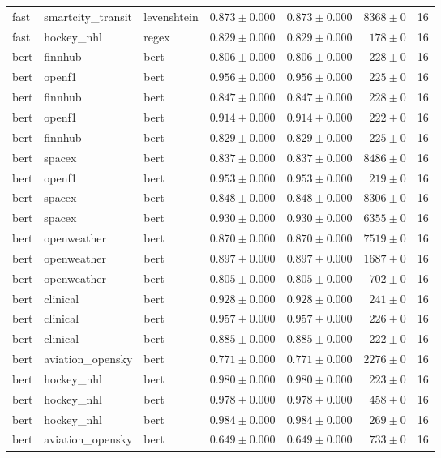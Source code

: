 \begin{table}[htbp]
\begin{tabular}{l l l r r r r}
fast & smartcity\_transit & levenshtein & $0.873\pm0.000$ & $0.873\pm0.000$ & $8368\pm0$ & 16 \\
fast & hockey\_nhl & regex & $0.829\pm0.000$ & $0.829\pm0.000$ & $178\pm0$ & 16 \\
bert & finnhub & bert & $0.806\pm0.000$ & $0.806\pm0.000$ & $228\pm0$ & 16 \\
bert & openf1 & bert & $0.956\pm0.000$ & $0.956\pm0.000$ & $225\pm0$ & 16 \\
bert & finnhub & bert & $0.847\pm0.000$ & $0.847\pm0.000$ & $228\pm0$ & 16 \\
bert & openf1 & bert & $0.914\pm0.000$ & $0.914\pm0.000$ & $222\pm0$ & 16 \\
bert & finnhub & bert & $0.829\pm0.000$ & $0.829\pm0.000$ & $225\pm0$ & 16 \\
bert & spacex & bert & $0.837\pm0.000$ & $0.837\pm0.000$ & $8486\pm0$ & 16 \\
bert & openf1 & bert & $0.953\pm0.000$ & $0.953\pm0.000$ & $219\pm0$ & 16 \\
bert & spacex & bert & $0.848\pm0.000$ & $0.848\pm0.000$ & $8306\pm0$ & 16 \\
bert & spacex & bert & $0.930\pm0.000$ & $0.930\pm0.000$ & $6355\pm0$ & 16 \\
bert & openweather & bert & $0.870\pm0.000$ & $0.870\pm0.000$ & $7519\pm0$ & 16 \\
bert & openweather & bert & $0.897\pm0.000$ & $0.897\pm0.000$ & $1687\pm0$ & 16 \\
bert & openweather & bert & $0.805\pm0.000$ & $0.805\pm0.000$ & $702\pm0$ & 16 \\
bert & clinical & bert & $0.928\pm0.000$ & $0.928\pm0.000$ & $241\pm0$ & 16 \\
bert & clinical & bert & $0.957\pm0.000$ & $0.957\pm0.000$ & $226\pm0$ & 16 \\
bert & clinical & bert & $0.885\pm0.000$ & $0.885\pm0.000$ & $222\pm0$ & 16 \\
bert & aviation\_opensky & bert & $0.771\pm0.000$ & $0.771\pm0.000$ & $2276\pm0$ & 16 \\
bert & hockey\_nhl & bert & $0.980\pm0.000$ & $0.980\pm0.000$ & $223\pm0$ & 16 \\
bert & hockey\_nhl & bert & $0.978\pm0.000$ & $0.978\pm0.000$ & $458\pm0$ & 16 \\
bert & hockey\_nhl & bert & $0.984\pm0.000$ & $0.984\pm0.000$ & $269\pm0$ & 16 \\
bert & aviation\_opensky & bert & $0.649\pm0.000$ & $0.649\pm0.000$ & $733\pm0$ & 16 \\

\end{tabular}
\end{table}
